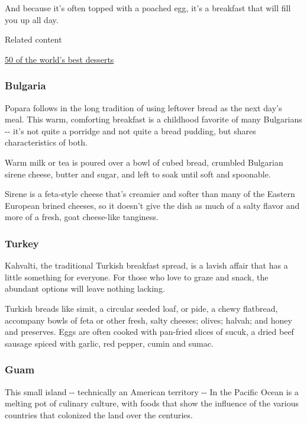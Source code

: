 And because it's often topped with a poached egg, it's a breakfast that
will fill you up all day.

Related content

\href{/travel/article/world-50-best-desserts/index.html}{50 of the
world's best desserts}

\hypertarget{bulgaria}{%
\subsubsection{Bulgaria}\label{bulgaria}}

Popara follows in the long tradition of using leftover bread as the next
day's meal. This warm, comforting breakfast is a childhood favorite of
many Bulgarians -\/- it's not quite a porridge and not quite a bread
pudding, but shares characteristics of both.

Warm milk or tea is poured over a bowl of cubed bread, crumbled
Bulgarian sirene cheese, butter and sugar, and left to soak until soft
and spoonable.

Sirene is a feta-style cheese that's creamier and softer than many of
the Eastern European brined cheeses, so it doesn't give the dish as much
of a salty flavor and more of a fresh, goat cheese-like tanginess.

\hypertarget{turkey}{%
\subsubsection{Turkey}\label{turkey}}

Kahvalti, the traditional Turkish breakfast spread, is a lavish affair
that has a little something for everyone. For those who love to graze
and snack, the abundant options will leave nothing lacking.

Turkish breads like simit, a circular seeded loaf, or pide, a chewy
flatbread, accompany bowls of feta or other fresh, salty cheeses;
olives; halvah; and honey and preserves. Eggs are often cooked with
pan-fried slices of sucuk, a dried beef sausage spiced with garlic, red
pepper, cumin and sumac.

\hypertarget{guam}{%
\subsubsection{Guam}\label{guam}}

This small island -\/- technically an American territory -\/- In the
Pacific Ocean is a melting pot of culinary culture, with foods that show
the influence of the various countries that colonized the land over the
centuries.

